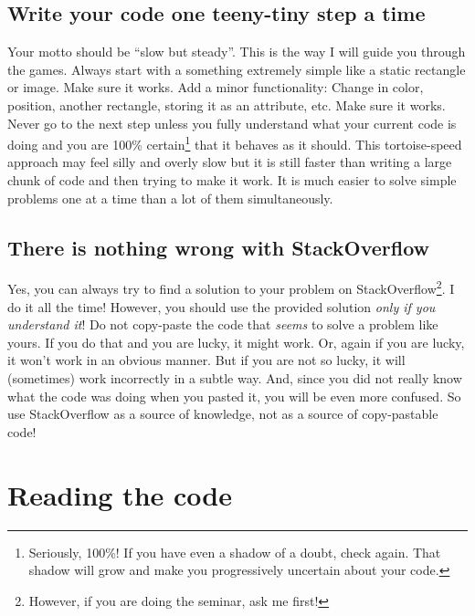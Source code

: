\documentclass[
]{book}
\begin{document}
\hypertarget{write-your-code-one-teeny-tiny-step-a-time}{%
\subsection{Write your code one teeny-tiny step a time}\label{write-your-code-one-teeny-tiny-step-a-time}}

Your motto should be ``slow but steady''. This is the way I will guide you through the games. Always start with a something extremely simple like a static rectangle or image. Make sure it works. Add a minor functionality: Change in color, position, another rectangle, storing it as an attribute, etc. Make sure it works. Never go to the next step unless you fully understand what your current code is doing and you are 100\% certain\footnote{Seriously, 100\%! If you have even a shadow of a doubt, check again. That shadow will grow and make you progressively uncertain about your code.} that it behaves as it should. This tortoise-speed approach may feel silly and overly slow but it is still faster than writing a large chunk of code and then trying to make it work. It is much easier to solve simple problems one at a time than a lot of them simultaneously.

\hypertarget{there-is-nothing-wrong-with-stackoverflow}{%
\subsection{There is nothing wrong with StackOverflow}\label{there-is-nothing-wrong-with-stackoverflow}}

Yes, you can always try to find a solution to your problem on StackOverflow\footnote{However, if you are doing the seminar, ask me first!}. I do it all the time! However, you should use the provided solution \emph{only if you understand it}! Do not copy-paste the code that \emph{seems} to solve a problem like yours. If you do that and you are lucky, it might work. Or, again if you are lucky, it won't work in an obvious manner. But if you are not so lucky, it will (sometimes) work incorrectly in a subtle way. And, since you did not really know what the code was doing when you pasted it, you will be even more confused. So use StackOverflow as a source of knowledge, not as a source of copy-pastable code!

\hypertarget{reading-tips}{%
\section{Reading the code}\label{reading-tips}}
\end{document}
